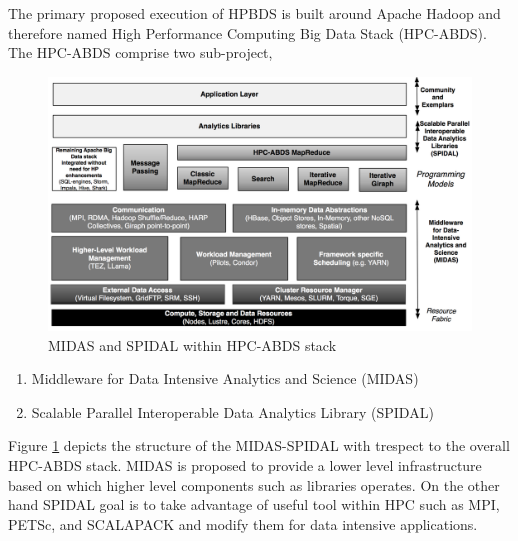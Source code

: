 \documentclass[runningheads,a4paper]{llncs}
\begin{document}
The primary proposed execution of HPBDS is built around Apache Hadoop and therefore named High Performance Computing Big Data Stack (HPC-ABDS). The HPC-ABDS comprise two sub-project,
\begin{figure}[h]
	\includegraphics[scale=0.2]{./images/MIDASSPIDAL.png}
	\centering
	\caption{MIDAS and SPIDAL within HPC-ABDS stack\cite{qiu2014towards}}
	\label{fig:MIDAS_SPIDAL}
\end{figure}
\begin{enumerate}
	\item Middleware for Data Intensive Analytics and Science (MIDAS)
	\item Scalable Parallel Interoperable Data Analytics Library (SPIDAL)  
\end{enumerate}

Figure \ref{fig:MIDAS_SPIDAL} depicts the structure of the MIDAS-SPIDAL with trespect to the overall HPC-ABDS stack. MIDAS is proposed to provide a lower level infrastructure based on which higher level components such as libraries operates. On the other hand SPIDAL goal is to take advantage of useful tool within HPC such as MPI, PETSc, and SCALAPACK and modify them for data intensive applications.\\
\end{document}

